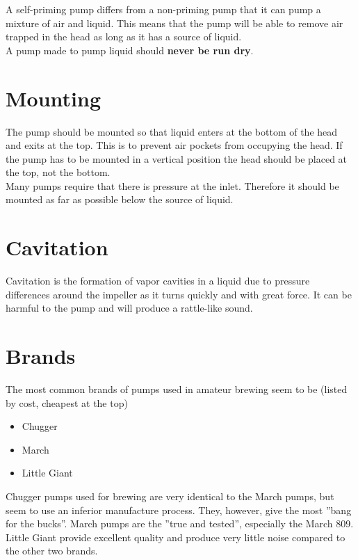 \documentclass[11pt,fleqn,openany]{book} %
\begin{document}
A self-priming pump differs from a non-priming pump that it can pump a mixture of air and liquid. This means that the pump will be able to remove air trapped in the head as long as it has a source of liquid.\\

A pump made to pump liquid should \textbf{never be run dry}.

\section{Mounting}

The pump should be mounted so that liquid enters at the bottom of the head and exits at the top. This is to prevent air pockets from occupying the head. If the pump has to be mounted in a vertical position the head should be placed at the top, not the bottom.\\

Many pumps require that there is pressure at the inlet. Therefore it should be mounted as far as possible below the source of liquid.

\section{Cavitation}

Cavitation is the formation of vapor cavities in a liquid due to pressure differences around the impeller as it turns quickly and with great force. It can be harmful to the pump and will produce a rattle-like sound.

\section{Brands}

The most common brands of pumps used in amateur brewing seem to be (listed by cost, cheapest at the top)

\begin{itemize}
\item Chugger
\item March
\item Little Giant\\
\end{itemize}

Chugger pumps used for brewing are very identical to the March pumps, but seem to use an inferior manufacture process. They, however, give the most ''bang for the bucks''. March pumps are the ''true and tested'', especially the March 809. Little Giant provide excellent quality and produce very little noise compared to the other two brands.
\end{document}
